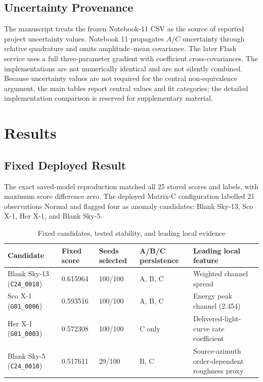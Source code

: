 \documentclass[conference]{IEEEtran}
\begin{document}
\subsection{Uncertainty Provenance}

The manuscript treats the frozen Notebook-11 CSV as the source of reported project uncertainty values. Notebook 11 propagates $A/C$ uncertainty through relative quadrature and omits amplitude--mean covariance. The later Flask service uses a full three-parameter gradient with coefficient cross-covariances. The implementations are not numerically identical and are not silently combined. Because uncertainty values are not required for the central non-equivalence argument, the main tables report central values and fit categories; the detailed implementation comparison is reserved for supplementary material.


\section{Results}

\subsection{Fixed Deployed Result}

The exact saved-model reproduction matched all 25 stored scores and labels, with maximum score difference zero. The deployed Matrix-C configuration labelled 21 observations Normal and flagged four as anomaly candidates: Blank Sky-13, Sco X-1, Her X-1, and Blank Sky-5.


\begin{table}[t]
\centering
\caption{Fixed candidates, tested stability, and leading local evidence}
\label{tab:3}
\footnotesize
\begin{tabular}{@{}p{}p{}p{}p{}p{}@{}}
\toprule
Candidate & Fixed score & Seeds selected & A/B/C persistence & Leading local feature \\
\midrule
Blank Sky-13 (\texttt{C24\_0018}) & 0.615964 & 100/100 & A, B, C & Weighted channel spread \\
Sco X-1 (\texttt{G01\_0006}) & 0.593516 & 100/100 & A, B, C & Energy peak channel (2.454) \\
Her X-1 (\texttt{G01\_0003}) & 0.572308 & 100/100 & C only & Delivered-light-curve rate coefficient \\
Blank Sky-5 (\texttt{C24\_0010}) & 0.517611 & 29/100 & B, C & Source-azimuth order-dependent roughness proxy \\
\bottomrule
\end{tabular}
\end{table}
\end{document}
